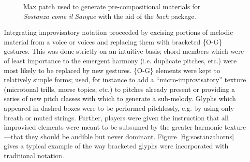         \begin{figure}
            \centering
            \captionsetup{width=.5\textwidth}
            \caption{Max patch used to generate pre-compositional materials for \textit{Sostanza come il Sangue} with the aid of the \textit{bach} package.}
            \label{fig:sostanzapatch}
        \end{figure}

    Integrating improvisatory notation proceeded by excising portions of melodic material from a voice or voices and replacing them with bracketed \{O-G\} gestures. This was done strictly on an intuitive basis; chord members which were of least importance to the emergent harmony (i.e. duplicate pitches, etc.) were most likely to be replaced by new gestures. \{O-G\} elements were kept to relatively simple forms; used, for instance to add a ``micro-improvisatory'' texture (microtonal trills, morse topics, etc.) to pitches already present or providing a series of new pitch classes with which to generate a sub-melody. Glyphs which appeared in dashed boxes were to be performed pitchlessly, e.g. by using only breath or muted strings. Further, players were given the instruction that all improvised elements were meant to be subsumed by the greater harmonic texture---that they should be audible but never dominant. Figure~\ref{fig:sostanzahorns} gives a typical example of the way bracketed glyphs were incorporated with traditional notation.

